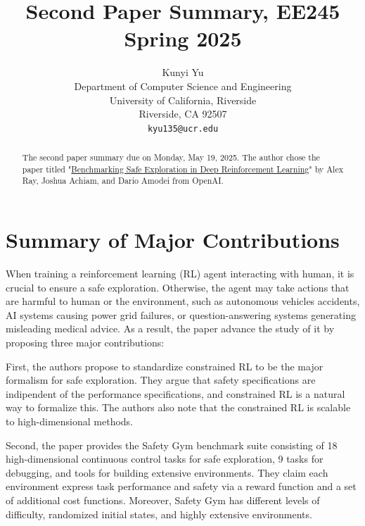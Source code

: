 \documentclass{article}
\title{Second Paper Summary, EE245 Spring 2025}
\author{%
  Kunyi Yu \\
  Department of Computer Science and Engineering \\
  University of California, Riverside \\
  Riverside, CA 92507 \\
  \texttt{kyu135@ucr.edu} \\
}
\begin{document}

\maketitle

\begin{abstract}
  The second paper summary due on Monday, May 19, 2025. The author chose the paper titled "\underline{Benchmarking Safe Exploration in Deep Reinforcement Learning}" by Alex Ray, Joshua Achiam, and Dario Amodei from OpenAI.

\end{abstract}


\section{Summary of Major Contributions}

When training a reinforcement learning (RL) agent interacting with human, it is crucial to ensure a safe exploration. Otherwise, the agent may take actions that are harmful to human or the environment, such as autonomous vehicles accidents, AI systems causing power grid failures, or question-answering systems generating misleading medical advice. As a result, the paper \cite{ray2019benchmarking} advance the study of it by proposing three major contributions:

First, the authors propose to standardize constrained RL to be the major formalism for safe exploration. They argue that safety specifications are indipendent of the performance specifications, and constrained RL is a natural way to formalize this. The authors also note that the constrained RL is scalable to high-dimensional methods.

Second, the paper provides the Safety Gym benchmark suite consisting of 18 high-dimensional continuous control tasks for safe exploration, 9 tasks for debugging, and tools for building extensive environments. They claim each environment express task performance and safety via a reward function and a set of additional cost functions. Moreover, Safety Gym has different levels of difficulty, randomized initial states, and highly extensive environments.
\end{document}
